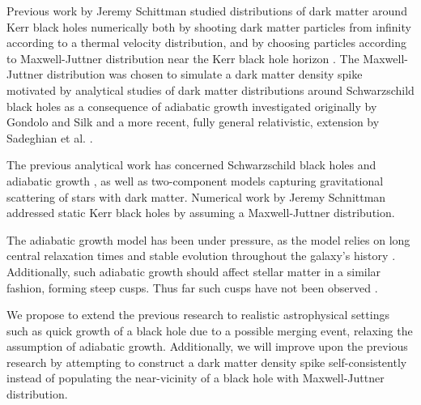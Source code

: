 \documentclass[12pt]{article}
\begin{document}
Previous work by Jeremy Schittman studied distributions of dark matter 
around Kerr black holes numerically both by shooting dark matter particles 
from infinity according to a thermal velocity distribution, and by 
choosing particles according to Maxwell-Juttner distribution near the 
Kerr black hole horizon \citep{schnittman2015}.
The Maxwell-Juttner distribution was 
chosen to simulate a dark matter density spike motivated by analytical 
studies of dark matter distributions around Schwarzschild black holes 
as a consequence of adiabatic growth investigated originally 
by Gondolo and Silk \citep{GS_1999} 
and a more recent, fully general relativistic, extension by Sadeghian et al. 
\citep{Sadeghian_Ferrer_Will_2013}.


The previous analytical work has concerned Schwarzschild black holes 
and adiabatic growth \citep{GS_1999, Sadeghian_Ferrer_Will_2013}, as well 
as two-component models capturing gravitational scattering of stars 
with dark matter. Numerical work by Jeremy Schnittman 
addressed static Kerr black holes by assuming a Maxwell-Juttner 
distribution.

The adiabatic growth model has been under pressure, as 
the model relies on long central relaxation times and stable 
evolution throughout the galaxy's history 
\citep{ullio2001spike_criticism, merritt2002merger_criticism, bertone2005}.
Additionally, such adiabatic growth should affect stellar matter 
in a similar fashion, forming steep cusps. Thus far such cusps have not been 
observed \citep{merritt2006dynamics}. %


We propose to extend the previous research to realistic astrophysical 
settings such as quick growth of a black hole due to a possible merging event, 
relaxing the assumption of adiabatic growth. Additionally, 
we will improve upon the previous research by attempting to 
construct a dark matter density spike self-consistently instead of 
populating the near-vicinity of a black hole with Maxwell-Juttner distribution.
\end{document}
